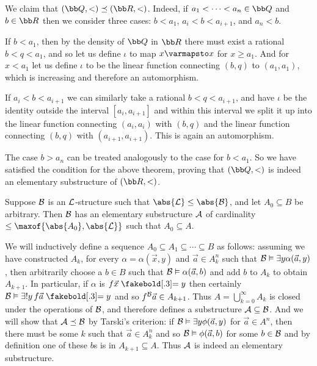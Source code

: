     We claim that $({\bb Q},<)\preceq({\bb R},<)$.
    Indeed, if $a_1<\cdots<a_n\in{\bb Q}$ and $b\in{\bb R}$ then we consider three cases: $b<a_1$, $a_i<b<a_{i+1}$, and $a_n<b$.
    \benum
        \item If $b<a_1$, then by the density of ${\bb Q}$ in ${\bb R}$ there must exist a rational $b<q<a_1$, and so let us define $\iota$ to map $x\varmapsto x$ for $x\geq a_1$.
        And for $x<a_1$ let us define $\iota$ to be the linear function connecting $(b,q)$ to $(a_1,a_1)$, which is increasing and therefore an automorphism.
        \item If $a_i<b<a_{i+1}$ we can similarly take a rational $b<q<a_{i+1}$, and have $\iota$ be the identity outside the interval $[a_i,a_{i+1}]$ and within this interval we split it up into the
        linear function connecting $(a_i,a_i)$ with $(b,q)$ and the linear function connecting $(b,q)$ with $(a_{i+1},a_{i+1})$.
        This is again an automorphism.
        \item The case $b>a_n$ can be treated analogously to the case for $b<a_1$.
    \eenum
    So we have satisfied the condition for the above theorem, proving that $({\bb Q},<)$ is indeed an elementary substructure of $({\bb R},<)$.

\eexam

\bthrm[title=Downward L\"owenheim-Skolem Theorem, name=downlowskol]

    Suppose ${\cal B}$ is an ${\cal L}$-structure such that $\abs{{\cal L}}\leq\abs{{\cal B}}$, and let $A_0\subseteq B$ be arbitrary.
    Then ${\cal B}$ has an elementary substructure ${\cal A}$ of cardinality $\leq\maxof{\abs{A_0},\abs{{\cal L}}}$ such that $A_0\subseteq A$.

\ethrm

We will inductively define a sequence $A_0\subseteq A_1\subseteq\cdots\subseteq B$ as follows: assuming we have constructed $A_k$, for every $\alpha=\alpha(\vec x,y)$ and $\vec a\in A_k^n$ such that
${\cal B}\vDash\exists y\alpha(\vec a,y)$, then arbitrarily choose a $b\in B$ such that ${\cal B}\vDash\alpha(\vec a,b)$ and add $b$ to $A_k$ to obtain $A_{k+1}$.
In particular, if $\alpha$ is $f\vec x\eq y$ then certainly ${\cal B}\vDash\exists!y\,f\vec a\eq y$ and so $f^{\cal B}\vec a\in A_{k+1}$.
Thus $A=\bigcup_{k=0}^\infty A_k$ is closed under the operations of ${\cal B}$, and therefore defines a substructure ${\cal A}\subseteq{\cal B}$.
And we will show that ${\cal A}\preceq{\cal B}$ by Tarski's criterion: if ${\cal B}\vDash\exists y\phi(\vec a,y)$ for $\vec a\in A^n$, then there must be some $k$ such that $\vec a\in A_k^n$ and so
${\cal B}\vDash\phi(\vec a,b)$ for some $b\in{\cal B}$ and by definition one of these $b$s is in $A_{k+1}\subseteq A$.
Thus ${\cal A}$ is indeed an elementary substructure.

